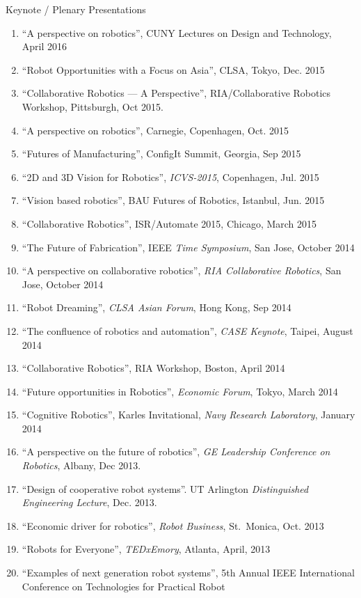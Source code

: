 \documentclass{article}
\begin{document}
\begin{cv}
\begin{cvlist}{Keynote / Plenary Presentations}
\begin{enumerate}
			\item ``A perspective on robotics'', CUNY Lectures on Design and Technology, April 2016
			\item ``Robot Opportunities with a Focus on Asia'', CLSA, Tokyo,  Dec. 2015
			\item ``Collaborative Robotics --- A Perspective'', RIA/Collaborative Robotics Workshop, Pittsburgh, Oct 2015.
			\item ``A perspective on robotics'', Carnegie, Copenhagen, Oct. 2015
			\item ``Futures of Manufacturing'', ConfigIt Summit, Georgia, Sep 2015
			\item ``2D and 3D Vision for Robotics'', {\em ICVS-2015}, Copenhagen, Jul. 2015
			\item ``Vision based robotics'', BAU Futures of Robotics, Istanbul, Jun. 2015
			\item ``Collaborative Robotics'', ISR/Automate 2015, Chicago, March 2015
			\item ``The Future of Fabrication'', IEEE {\em Time Symposium}, San Jose, October 2014
			\item ``A perspective on collaborative robotics'', {\em RIA Collaborative Robotics}, San Jose, October 2014
			\item ``Robot Dreaming'', {\em CLSA Asian Forum}, Hong Kong, Sep 2014
			\item ``The confluence of robotics and automation'', {\em CASE Keynote}, Taipei, August 2014
			\item ``Collaborative Robotics'', RIA Workshop, Boston, April 2014
			\item ``Future opportunities in Robotics'', {\em Economic Forum}, Tokyo, March 2014
			\item ``Cognitive Robotics'', Karles Invitational, {\em Navy Research Laboratory}, January 2014
			\item ``A perspective on the future of robotics'', {\em GE Leadership Conference on Robotics}, Albany, Dec 2013.
			\item ``Design of cooperative robot systems''. UT Arlington {\em Distinguished Engineering Lecture}, Dec. 2013.
			\item ``Economic driver for robotics'', {\em Robot Business}, St.\ Monica,  Oct. 2013
			\item ``Robots for Everyone'', {\em TEDxEmory}, Atlanta, April, 2013
			\item ``Examples of next generation robot systems'', 5th Annual IEEE
			      International Conference on Technologies for Practical Robot

\end{enumerate}
\end{cvlist}
\end{cv}
\end{document}
